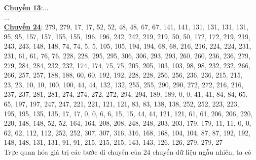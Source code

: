 \documentclass[a4paper, 13pt]{report}
\begin{document}
\textbf{\underline{Chuyến 13}}:...\\
...\\
\textbf{\underline{Chuyến 24}}: 279, 279, 17, 17, 52, 52, 48, 48, 67, 67, 141, 141, 131, 131, 131, 131, 95, 95, 157, 157, 155, 155, 196, 196, 242, 242, 219, 219, 50, 50, 172, 172, 219, 219, 243, 243, 148, 148, 74, 74, 5, 5, 105, 105, 194, 194, 68, 68, 216, 216, 224, 224, 231, 231, 61, 61, 76, 76, 228, 228, 295, 295, 306, 306, 293, 293, 260, 260, 236, 236, 279, 279, 284, 284, 232, 232, 174, 174, 75, 75, 205, 205, 103, 103, 98, 98, 232, 232, 266, 266, 257, 257, 188, 188, 60, 60, 192, 192, 228, 228, 256, 256, 236, 236, 215, 215, 23, 23, 10, 10, 100, 100, 44, 44, 132, 132, 255, 255, 290, 290, 272, 272, 216, 216, 237, 237, 281, 281, 274, 274, 272, 272, 294, 294, 189, 189, 0, 0, 41, 41, 84, 84, 65, 65, 197, 197, 247, 247, 221, 221, 121, 121, 83, 83, 138, 138, 252, 252, 223, 223, 195, 195, 135, 135, 17, 17, 0, 0, 6, 6, 15, 15, 44, 44, 121, 121, 61, 61, 206, 206, 220, 220, 148, 148, 52, 52, 164, 164, 208, 208, 248, 248, 203, 203, 179, 179, 11, 11, 0, 0, 62, 62, 112, 112, 252, 252, 307, 307, 316, 316, 168, 168, 104, 104, 87, 87, 192, 192, 148, 148, 131, 131, 91, 91, 215, 215, 215, 143, 143, 126, 126, 279, 279, 27\\
Trực quan hóa giá trị các bước di chuyển của 24 chuyến dữ liệu ngẫu nhiên, ta có\\
\FloatBarrier
\end{document}
